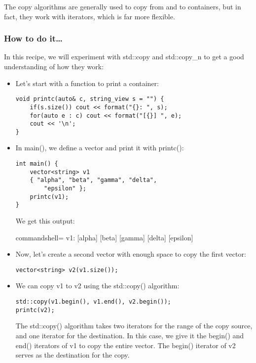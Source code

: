 
The copy algorithms are generally used to copy from and to containers, but in fact, they work with iterators, which is far more flexible.


\subsubsection{How to do it…}

In this recipe, we will experiment with std::copy and std::copy\_n to get a good understanding of how they work:

\begin{itemize}
\item 
Let's start with a function to print a container:

\begin{lstlisting}[style=styleCXX]
void printc(auto& c, string_view s = "") {
	if(s.size()) cout << format("{}: ", s);
	for(auto e : c) cout << format("[{}] ", e);
	cout << '\n';
}
\end{lstlisting}

\item 
In main(), we define a vector and print it with printc():

\begin{lstlisting}[style=styleCXX]
int main() {
	vector<string> v1
	{ "alpha", "beta", "gamma", "delta",
		"epsilon" };
	printc(v1);
}
\end{lstlisting}

We get this output:

\begin{tcblisting}{commandshell={}}
v1: [alpha] [beta] [gamma] [delta] [epsilon]
\end{tcblisting}

\item 
Now, let's create a second vector with enough space to copy the first vector:

\begin{lstlisting}[style=styleCXX]
vector<string> v2(v1.size());
\end{lstlisting}

\item 
We can copy v1 to v2 using the std::copy() algorithm:

\begin{lstlisting}[style=styleCXX]
std::copy(v1.begin(), v1.end(), v2.begin());
printc(v2);
\end{lstlisting}

The std::copy() algorithm takes two iterators for the range of the copy source, and one iterator for the destination. In this case, we give it the begin() and end() iterators of v1 to copy the entire vector. The begin() iterator of v2 serves as the destination for the copy.


\end{itemize}
